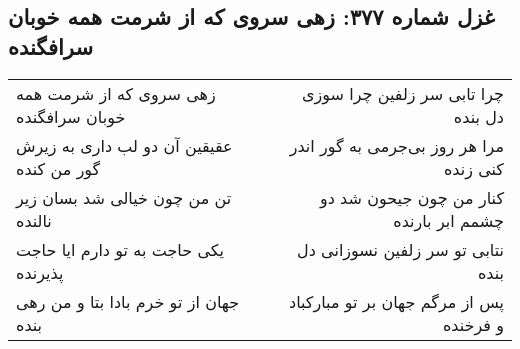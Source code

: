 \begin{center}
\section*{غزل شماره ۳۷۷: زهی سروی که از شرمت همه خوبان سرافگنده}
\label{sec:377}
\begin{longtable}{l p{0.5cm} r}
زهی سروی که از شرمت همه خوبان سرافگنده
&&
چرا تابی سر زلفین چرا سوزی دل بنده
\\
عقیقین آن دو لب داری به زیرش گور من کنده
&&
مرا هر روز بی‌جرمی به گور اندر کنی زنده
\\
تن من چون خیالی شد بسان زیر نالنده
&&
کنار من چون جیحون شد دو چشمم ابر بارنده
\\
یکی حاجت به تو دارم ایا حاجت پذیرنده
&&
نتابی تو سر زلفین نسوزانی دل بنده
\\
جهان از تو خرم بادا بتا و من رهی بنده
&&
پس از مرگم جهان بر تو مبارکباد و فرخنده
\\
\end{longtable}
\end{center}
